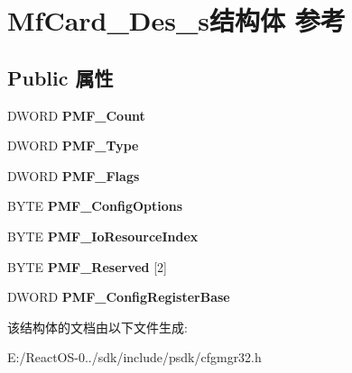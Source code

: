 \hypertarget{struct_mf_card___des__s}{}\section{Mf\+Card\+\_\+\+Des\+\_\+s结构体 参考}
\label{struct_mf_card___des__s}
\subsection*{Public 属性}
\begin{DoxyCompactItemize}
\item 
\mbox{\label{struct_mf_card___des__s_a9a90a18d3a6bcefbdd49ff13987821e2}} 
D\+W\+O\+RD {\bfseries P\+M\+F\+\_\+\+Count}
\item 
\mbox{\label{struct_mf_card___des__s_a0b52a79e586e1854980994a10f9ac2b6}} 
D\+W\+O\+RD {\bfseries P\+M\+F\+\_\+\+Type}
\item 
\mbox{\label{struct_mf_card___des__s_a45b3700f46f7f7ab6ef714cc79552b78}} 
D\+W\+O\+RD {\bfseries P\+M\+F\+\_\+\+Flags}
\item 
\mbox{\label{struct_mf_card___des__s_a54a11c0681f1b6c5489cfdde844e2efb}} 
B\+Y\+TE {\bfseries P\+M\+F\+\_\+\+Config\+Options}
\item 
\mbox{\label{struct_mf_card___des__s_aec6ec0ae8625a92a650e179293e3870b}} 
B\+Y\+TE {\bfseries P\+M\+F\+\_\+\+Io\+Resource\+Index}
\item 
\mbox{\label{struct_mf_card___des__s_acb8153ac7ee6da69fa7c8ca3ee407ae5}} 
B\+Y\+TE {\bfseries P\+M\+F\+\_\+\+Reserved} \mbox{[}2\mbox{]}
\item 
\mbox{\label{struct_mf_card___des__s_a3a345764e30818a314bed3820dfb7dea}} 
D\+W\+O\+RD {\bfseries P\+M\+F\+\_\+\+Config\+Register\+Base}
\end{DoxyCompactItemize}


该结构体的文档由以下文件生成\+:\begin{DoxyCompactItemize}
\item 
E\+:/\+React\+O\+S-\/0../sdk/include/psdk/cfgmgr32.\+h\end{DoxyCompactItemize}
